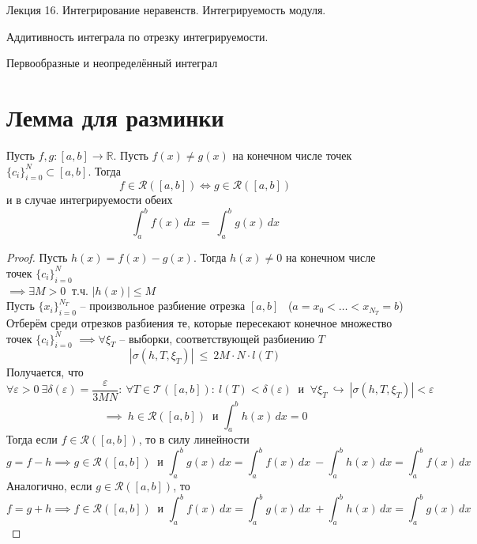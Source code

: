 \documentclass[11pt]{article}
\begin{document}
\begin{titlepage}
    \centering
    \vspace*{\fill}  %

    {\Huge Лекция 16. Интегрирование неравенств. Интегрируемость модуля. \par
    Аддитивность интеграла по отрезку интегрируемости. \par 
    Первообразные и неопределённый интеграл}

    \vspace*{\fill}  %
\end{titlepage}

\setcounter{page}{1}

\section{Лемма для разминки}

\begin{lemma}
  Пусть $f, g \colon [a, b] \to \mathbb{R}$. Пусть $f(x) \neq g(x)$ на конечном числе 
  точек $\{c_i\}^N_{i = 0} \subset [a, b]$. Тогда \[f \in \mathcal{R}([a, b]) 
  \Longleftrightarrow g \in \mathcal{R}([a, b])\]
  и в случае интегрируемости обеих 
  \[\int_{a}^{b} f(x)\,dx \ = \ \int_{a}^{b} g(x)\,dx \]
\end{lemma}

\begin{proof}
  Пусть $h(x) = f(x) - g(x)$. Тогда $h(x) \neq 0$ на конечном числе точек 
  $\{c_i\}^N_{i = 0}$ \\ $\implies \exists M > 0 \ \text{ т.ч. } 
  \left\lvert h(x) \right\rvert \leq M$ \\
  Пусть $\{x_i\}^{N_T}_{i = 0}$ -- произвольное разбиение отрезка $[a, b]$ \
  ($a = x_0 < \dots < x_{N_T} = b$) \\
  Отберём среди отрезков разбиения те, которые пересекают конечное множество 
  точек $\{c_i\}^N_{i = 0}$ $\implies \forall \xi_T$ -- выборки, соответствующей 
  разбиению $T$ \[\left\lvert \sigma (h, T, \xi_T) \right\rvert \ \leq \ 2M \cdot N \cdot l(T)\] 
  Получается, что 
  \[\forall \varepsilon > 0 \ \exists \delta(\varepsilon) = \frac{\varepsilon}{3MN}: \ 
  \forall T \in \mathcal{T}([a, b]): \ l(T) < \delta(\varepsilon) \ \text{ и } \ \forall 
  \xi_T \ \hookrightarrow \ \left\lvert \sigma (h, T, \xi_T) \right\rvert < \varepsilon\]
  \[\implies \ h \in \mathcal{R}([a, b]) \ \text{ и } \int_{a}^{b} h(x)\,dx = 0\]
  Тогда если $f \in \mathcal{R}([a, b])$, то в силу линейности
  \[g = f - h \implies g \in \mathcal{R}([a, b]) \ \text{ и } \int_{a}^{b} g(x)\,dx 
  = \int_{a}^{b} f(x)\,dx \ - \int_{a}^{b} h(x)\,dx = \int_{a}^{b} f(x)\,dx\]
  Аналогично, если $g \in \mathcal{R}([a, b])$, то 
  \[f = g + h \implies f \in \mathcal{R}([a, b]) \ \text{ и } \int_{a}^{b} f(x)\,dx 
  = \int_{a}^{b} g(x)\,dx \ + \int_{a}^{b} h(x)\,dx = \int_{a}^{b} g(x)\,dx\]
\end{proof}
\end{document}
